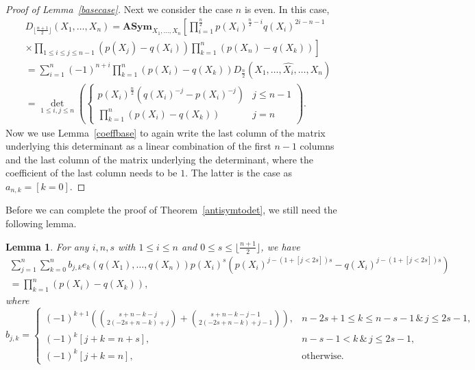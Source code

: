 \documentclass[12pt,dvipsnames]{amsart}
\newtheorem{lemma}[theorem]{Lemma}
\theoremstyle{definition}
\newcommand{\asym}{\mathbf{ASym}}
\begin{document}
\begin{proof}[Proof of Lemma~\ref{basecase}]
Next we consider the case $n$ is even. In this case, 
\begin{multline*} 
D_{\lfloor \frac{n+1}{2} \rfloor}(X_1,\ldots,X_n) =  \asym_{X_1,\ldots,X_n} 
\left[ \prod_{i=1}^{\frac{n}{2}} p(X_i)^{\frac{n}{2}-i} q(X_i)^{2i-n-1} \right.
\\ \left. 
\times \prod_{1 \le i \le j \le n-1} (p(X_j)-q(X_i)) \prod_{k=1}^n (p(X_n)-q(X_k)) \right] \\
= \sum_{i=1}^n  (-1)^{n+i} \prod_{k=1}^n \left(p(X_i)-q(X_k) \right) D_{\frac{n}{2}}(X_1,\ldots,\widehat{X_i},\ldots,X_n) \\
=  \det_{1 \le i, j \le n}
\left( \begin{cases} p(X_i)^{\frac{n}{2}} \left( q(X_i)^{-j} - p(X_i)^{-j} \right) & j \le n-1 \\
         \prod_{k=1}^n \left( p(X_i)-q(X_k) \right) & j=n \end{cases} \right).
\end{multline*} 
Now we use Lemma~\ref{coeffbase} to again write the last column of the matrix underlying this determinant as a linear combination of 
the first $n-1$ columns and the last column of the matrix underlying the determinant, where the coefficient of the last column needs to be 
$1$. The latter is the case as $a_{n,k}=[k=0]$. 
\end{proof} 


Before we can complete the proof of Theorem~\ref{antisymtodet}, we still need the following lemma.


\begin{lemma}
\label{generalcoeff}
For any $i,n,s$ with $1 \le i \le n$ and  
$0 \le s \le \lfloor \frac{n+1}{2} \rfloor$, we have 
\begin{multline*} 
\sum_{j=1}^n \sum_{k=0}^n b_{j,k} e_k(q(X_1),\ldots,q(X_n)) p(X_i)^s \left( p(X_i)^{j-(1+[j<2s])s}-q(X_i)^{j-(1+[j<2s])s} \right) \\
=\prod_{k=1}^n (p(X_i) - q(X_k)),
\end{multline*}                   
where 
$$
b_{j,k} = 
\begin{cases} 
(-1)^{k+1} \left( \binom{s+n-k-j}{2 (-2s+n-k)+j} 
+ \binom{s+n-k-j-1}{2 (-2s+n-k)+j-1} \right),
& n-2s+1 \le k \le n -s-1 \,  \&   \, j \le 2s-1, \\
(-1)^{k} [j+k=n+s], &  n - s-1 < k \, \&   \, j \le 2s-1, \\
(-1)^k [j+k=n], & \text{otherwise}. 
\end{cases} 
$$

\end{lemma} 
\end{document}
